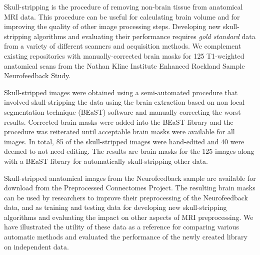 Skull-stripping is the procedure of removing non-brain tissue from anatomical MRI data. This procedure can be useful for calculating brain volume and for improving the quality of other image processing steps. Developing new skull-stripping algorithms and evaluating their performance requires \emph{gold standard} data from a variety of different scanners and acquisition methods. We complement existing repositories with manually-corrected brain masks for 125 T1-weighted anatomical scans from the Nathan Kline Institute Enhanced Rockland Sample Neurofeedback Study.

Skull-stripped images were obtained using a semi-automated procedure that involved skull-stripping the data using the brain extraction based on non local segmentation technique (BEaST) software and manually correcting the worst results. Corrected brain masks were added into the BEaST library and the procedure was reiterated until acceptable brain masks were available for all images. In total, 85 of the skull-stripped images were hand-edited and 40 were deemed to not need editing. The results are brain masks for the 125 images along with a BEaST library for automatically skull-stripping other data.


Skull-stripped anatomical images from the Neurofeedback sample are available for download from the Preprocessed Connectomes Project. The resulting brain masks can be used by researchers to improve their preprocessing of the Neurofeedback data, and as training and testing data for developing new skull-stripping algorithms and evaluating the impact on other aspects of MRI preprocessing. We have illustrated the utility of these data as a reference for comparing various automatic methods and evaluated the performance of the newly created library on independent data.
